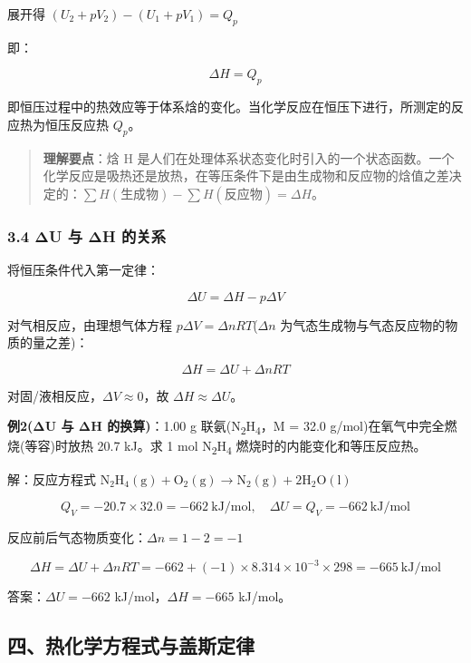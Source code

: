 展开得 \((U_2 + pV_2) - (U_1 + pV_1) = Q_p\)

即：

\[
\boxed{\Delta H = Q_p}
\]

即恒压过程中的热效应等于体系焓的变化。当化学反应在恒压下进行，所测定的反应热为恒压反应热 \(Q_p\)。

\begin{quote}
\textbf{理解要点}：焓 H 是人们在处理体系状态变化时引入的一个状态函数。一个化学反应是吸热还是放热，在等压条件下是由生成物和反应物的焓值之差决定的：\(\sum H(\text{生成物}) - \sum H(\text{反应物}) = \Delta H\)。
\end{quote}

\subsubsection{3.4 ΔU 与 ΔH 的关系}\label{ux3b4u-ux4e0e-ux3b4h-ux7684ux5173ux7cfb}

将恒压条件代入第一定律：

\[
\Delta U = \Delta H - p\Delta V
\]

对气相反应，由理想气体方程 \(p\Delta V = \Delta nRT\)(\(\Delta n\) 为气态生成物与气态反应物的物质的量之差)：

\[
\boxed{\Delta H = \Delta U + \Delta nRT}
\]

对固/液相反应，\(\Delta V \approx 0\)，故 \(\Delta H \approx \Delta U\)。

\textbf{例2(ΔU 与 ΔH 的换算)}：1.00 g 联氨(N\textsubscript{2}H\textsubscript{4}，M = 32.0 g/mol)在氧气中完全燃烧(等容)时放热 20.7 kJ。求 1 mol N\textsubscript{2}H\textsubscript{4} 燃烧时的内能变化和等压反应热。

解：反应方程式 \(\mathrm{N_2H_4(g) + O_2(g) \to N_2(g) + 2H_2O(l)}\)

\[Q_V = -20.7 \times 32.0 = -662\ \mathrm{kJ/mol}, \quad \Delta U = Q_V = -662\ \mathrm{kJ/mol}\]

反应前后气态物质变化：\(\Delta n = 1 - 2 = -1\)

\[\Delta H = \Delta U + \Delta nRT = -662 + (-1) \times 8.314 \times 10^{-3} \times 298 = -665\ \mathrm{kJ/mol}\]

答案：\(\Delta U = -662\) kJ/mol，\(\Delta H = -665\) kJ/mol。

\subsection{四、热化学方程式与盖斯定律}\label{ux56dbux70edux5316ux5b66ux65b9ux7a0bux5f0fux4e0eux76d6ux65afux5b9aux5f8b}

